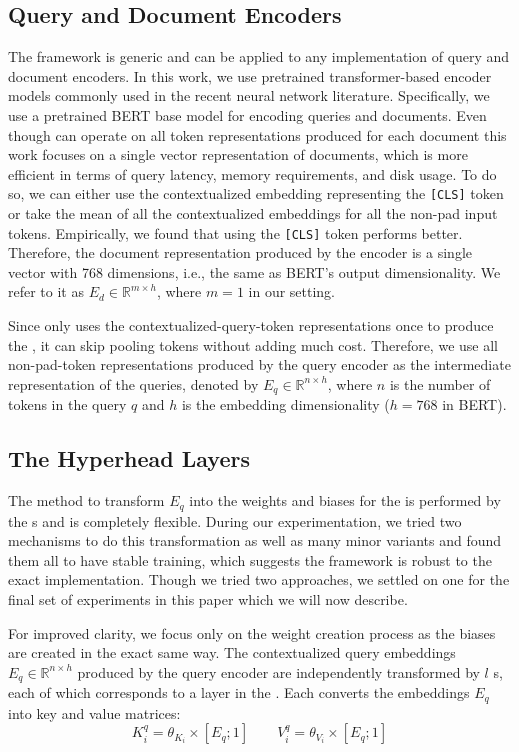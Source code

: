 \documentclass[sigconf,]{acmart}
\begin{document}
\subsection{Query and Document Encoders}
The \name{} framework is generic and can be applied to any implementation of query and document encoders. In this work, we use pretrained transformer-based encoder models commonly used in the recent neural network literature. Specifically, we use a pretrained BERT base model \cite{BERT} for encoding queries and documents. Even though \name{} can operate on all token representations produced for each document this work focuses on a single vector representation of documents, which is more efficient in terms of query latency, memory requirements, and disk usage. To do so, we can either use the contextualized embedding representing the \texttt{[CLS]} token or take the mean of all the contextualized embeddings for all the non-pad input tokens. Empirically, we found that using the \texttt{[CLS]} token performs better. Therefore, the document representation produced by the encoder is a single vector with 768 dimensions, i.e., the same as BERT's output dimensionality. We refer to it as $E_d \in \mathbb{R}^{m \times h}$, where $m=1$ in our setting.

Since \name{} only uses the contextualized-query-token representations once to produce the \mininame{}, it can skip pooling tokens without adding much cost. Therefore, we use all non-pad-token representations produced by the query encoder as the intermediate representation of the queries, denoted by $E_q \in \mathbb{R}^{n \times h}$, where $n$ is the number of tokens in the query $q$ and $h$ is the embedding dimensionality ($h=768$ in BERT).


\subsection{The Hyperhead Layers} \label{sec:hyperhead-layers}
The method to transform $E_q$ into the weights and biases for the \mininame{} is performed by the \hyperheadlayer{}s and is completely flexible. During our experimentation, we tried two mechanisms to do this transformation as well as many minor variants and found them all to have stable training, which suggests the \name{} framework is robust to the exact \hyperheadlayer{} implementation. Though we tried two approaches, we settled on one for the final set of experiments in this paper which we will now describe.

For improved clarity, we focus only on the weight creation process as the biases are created in the exact same way. The contextualized query embeddings $E_q \in \mathbb{R}^{n \times h}$ produced by the query encoder are independently transformed by $l$ \hyperheadlayer{}s, each of which corresponds to a layer in the \mininame{}. Each \hyperheadlayer{} converts the embeddings $E_q$ into key and value matrices:
\begin{equation}
    K^q_i = \theta_{K_i} \times [E_q; 1]\quad\quad V^q_i = \theta_{V_i} \times [E_q; 1]
\end{equation}
\end{document}
